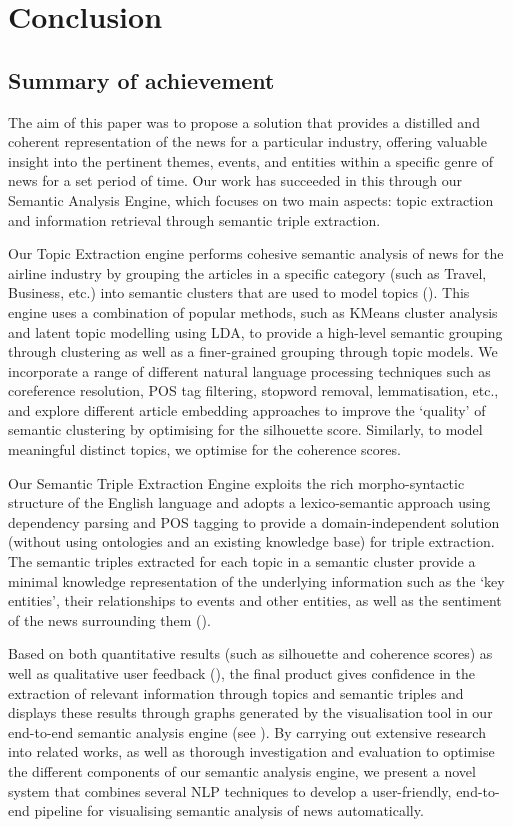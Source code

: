 \chapter{Conclusion}
\vspace*{-1em}
\section{Summary of achievement}

The aim of this paper was to propose a solution that provides a distilled and coherent representation of the news for a particular industry, offering valuable insight into the pertinent themes, events, and entities within a specific genre of news for a set period of time. Our work has succeeded in this through our Semantic Analysis Engine, which focuses on two main aspects: topic extraction and information retrieval through semantic triple extraction. 

Our Topic Extraction engine performs cohesive semantic analysis of news for the airline industry by grouping the articles in a specific category (such as Travel, Business, etc.) into semantic clusters that are used to model topics (). This engine uses a combination of popular methods, such as KMeans cluster analysis and latent topic modelling using LDA, to provide a high-level semantic grouping through clustering as well as a finer-grained grouping through topic models. We incorporate a range of different natural language processing techniques such as coreference resolution, POS tag filtering, stopword removal, lemmatisation, etc., and explore different article embedding approaches to improve the `quality' of semantic clustering by optimising for the silhouette score. Similarly, to model meaningful distinct topics, we optimise for the coherence scores.

Our Semantic Triple Extraction Engine exploits the rich morpho-syntactic structure of the English language and adopts a lexico-semantic approach using dependency parsing and POS tagging to provide a domain-independent solution (without using ontologies and an existing knowledge base) for triple extraction. The semantic triples extracted for each topic in a semantic cluster provide a minimal knowledge representation of the underlying information such as the `key entities', their relationships to events and other entities, as well as the sentiment of the news surrounding them ().

Based on both quantitative results (such as silhouette and coherence scores) as well as qualitative user feedback (), the final product gives confidence in the extraction of relevant information through topics and semantic triples and displays these results through graphs generated by the visualisation tool in our end-to-end semantic analysis engine (see ). By carrying out extensive research into related works, as well as thorough investigation and evaluation to optimise the different components of our semantic analysis engine, we present a novel system that combines several NLP techniques to develop a user-friendly, end-to-end pipeline for visualising semantic analysis of news automatically.


